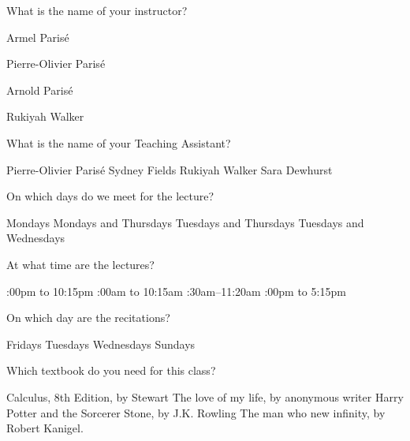 \documentclass[addpoints, 12pt]{exam}%
\theoremstyle{definition}
\newcommand{\spc}{\vspace*{0.5cm}}
\begin{document}
\begin{questions}

\question[1]
What is the name of your instructor?
	
\begin{oneparchoices}
\choice Armel Paris{\'e}

\CorrectChoice Pierre-Olivier Paris{\'e}

\choice Arnold Paris{\'e}

\choice Rukiyah Walker
\end{oneparchoices}

\spc

\question[1]
What is the name of your Teaching Assistant?

\begin{oneparchoices}
\choice Pierre-Olivier Paris{\'e}
\choice Sydney Fields
\CorrectChoice Rukiyah Walker
\choice Sara Dewhurst
\end{oneparchoices}

\spc

\question[1]
On which days do we meet for the lecture?

\begin{choices}
\begin{multicols}{2}
\choice Mondays
\choice Mondays and Thursdays
\CorrectChoice Tuesdays and Thursdays
\choice Tuesdays and Wednesdays
\end{multicols}
\end{choices}

\spc

\question[1]
At what time are the lectures?

\begin{choices}
\begin{multicols}{2}
:00pm to 10:15pm
:00am to 10:15am
:30am--11:20am
:00pm to 5:15pm
\end{multicols}
\end{choices}

\spc

\question[1]
On which day are the recitations?

\begin{oneparchoices}
\CorrectChoice Fridays
\choice Tuesdays
\choice Wednesdays
\choice Sundays
\end{oneparchoices}

\spc

\question[1]
Which textbook do you need for this class?

\begin{choices}
\CorrectChoice Calculus, 8th Edition, by Stewart
\choice The love of my life, by anonymous writer
\choice Harry Potter and the Sorcerer Stone, by J.K. Rowling
\choice The man who new infinity, by Robert Kanigel.
\end{choices}


\end{questions}
\end{document}
